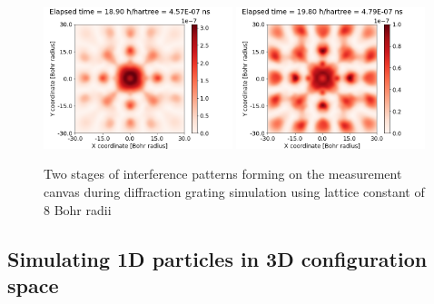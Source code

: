 \begin{figure}
	\begin{center}
		\includegraphics[width=0.49\textwidth]{figures/optical_grid_interference_01_8_grid.png}
		\includegraphics[width=0.49\textwidth]{figures/optical_grid_interference_02_8_grid.png}
		\caption{Two stages of interference patterns forming on the measurement canvas during diffraction grating simulation using lattice constant of $8$ Bohr radii}
		\label{fig:optical_grid_interference_8_grid}
	\end{center}	
\end{figure}

\subsection{Simulating 1D particles in 3D configuration space}

